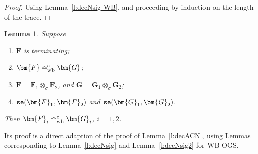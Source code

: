 \documentclass[11pt,a4paper]{amsart}
\theoremstyle{plain}
\theoremstyle{definition}
\theoremstyle{defC}
\theoremstyle{thmC}
\theoremstyle{plain}
\numberwithin{equation}{section}
\newif\ifcutLMCS\cutLMCSfalse
\newcommand{\wrt}{with respect to\xspace}  %
\newcommand{\tr}{s}
\newcommand{\tracerho}{t}
\newcommand{\tracetheta}{u}
\newcommand{\stt}{\sigma}
\newcommand{\WBOGS}{\mbox{{\rm WB-OGS}}\xspace}      %
\newcommand{\okC}[2]{{\tt se}(#1,#2)}  %
\newcommand{\rmm}[1]{{\tt{\lowercase{#1}}}}
\newcommand{\genArr}[2]{\mathrel{\stackrel{{#1}}{\Longrightarrow}_{\rmm{\lowercase{#2}}}}}  %
\newcommand{\ArrWB}[1]{\genArr{#1}{WB}}          %
\newcommand{\genTEcomp}[1]{\mathrel{\bumpeq^{\rm c}_{\rm{\lowercase{#1}}}}} %
\newcommand{\TEwbc}{\genTEcomp{WB}}       %
\newcommand{\interlWBs}[3]{{\tt inter_{wb}^{#1}}( #2, #3)}
\newcommand{\FF}{F}
\newcommand{\GG}{G}
\newcommand{\FFb}{{\bm{\FF}}} %
\newcommand{\GGb}{{\bm{\GG}}} %
\theoremstyle{plain}
\newtheorem{lemma}[thm]{Lemma}
\theoremstyle{definition}
\begin{document}
\begin{proof}
Using Lemma~\ref{l:decNsig-WB}, and proceeding by induction on the length of the trace.  
\end{proof} 
\fi

\begin{lemma}
\label{l:decWBCN}
  Suppose 
  \begin{enumerate}
    \item $\FFb$ is terminating;
    \item $\FFb  \TEwbc \GGb$; 
    \item $\FFb = \FFb_1 \otimes_{\stt} \FFb_2$,   
    and  
    $\GGb = \GGb_1 \otimes_{\stt} \GGb_2$;
    \item $\okC{\FFb_1}{\FFb_2}$ and $\okC{\GGb_1}{\GGb_2}$.
  \end{enumerate} 
  Then
  $\FFb_i  \TEwbc \GGb_i$, $i=1,2$. 
\end{lemma}   
\noindent
Its proof is a direct adaption of the proof of Lemma~\ref{l:decACN},
using Lemmas corresponding to Lemma~\ref{l:decNsig} and Lemma~\ref{l:decNsig2}
for \WBOGS.


\ifcutLMCS

\begin{proof}
  We write $\stt_1$ for the stack of both $\FFb_1, \GGb_1$
  and $\stt_2$ for the one of $\FFb_2, \GGb_2$.
  Suppose $\FFb_1  \TEwbc \GGb_1$ 
  does not hold (the  case of $\FFb_2$ and $\GGb_2$  is similar).
  Thus there is $\tracerho$ a well-bracketed complete trace \wrt $\stt_1$, for $\FFb_1$ and not for $\GGb_1$. 
  
  Since $\FFb$ is terminating
  and $\FFb  \TEwbc \GGb$, 
  there is for both $\FFb$ and $\GGb$ 
  a well-bracketed complete trace
  $\tr$ \wrt $\stt$
  the stack of $\FFb$ and $\GGb$.
  
  By Lemma~\ref{c:dec_GS_WB}, there are traces $\tr_i$
  well-bracketed complete \wrt $\stt_i$ such that 
  $\FFb_i \ArrWB {\tr_i}$ 
  and $\tr \in \interlWBs{\stt}{ \tr_1}{\tr_2}$.
  By Lemma~\ref{l:decNsig2-WB}, we also have that
  $\GGb_i \ArrWB {\tr_i}$.   
  
  By Lemma~\ref{c:dec_GS_WB}, there is 
   $\tracetheta \in \interlWBs{\stt}{\tracerho}{\tr_2}$ complete such that
  $\FFb \ArrWB {\tracetheta } $.
  Since 
  $\FFb  \TEwbc \GGb$, 
  we also have $\GGb \ArrWB {\tracetheta } $. 
  By Lemma~\ref{l:decNsig2-WB}, 
  we deduce that 
  $\GGb_1 \ArrWB {\tracerho }$ and 
  $\GGb_2 \ArrWB {\tr_2 }$.
  This contradicts the assumption that 
   ${\tracerho }$ is not a trace for $\GGb_1$.
\end{proof} 
\fi
\end{document}
